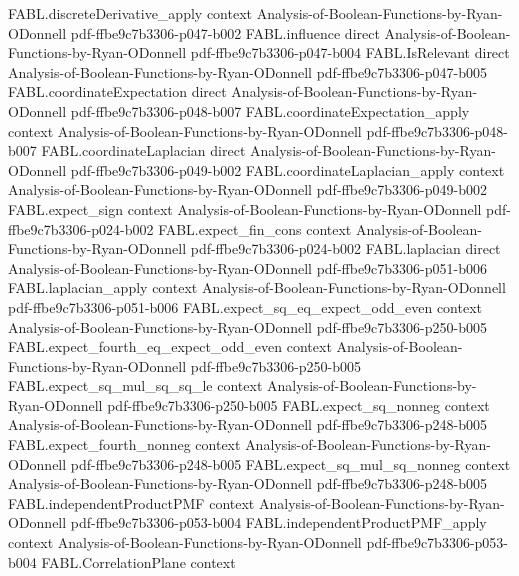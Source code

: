 \begin{theorem}
\proofstep
  {FABL.discreteDerivative_apply}
  {context}
  {Analysis-of-Boolean-Functions-by-Ryan-ODonnell}
  {pdf-ffbe9c7b3306-p047-b002}
\proofstep
  {FABL.influence}
  {direct}
  {Analysis-of-Boolean-Functions-by-Ryan-ODonnell}
  {pdf-ffbe9c7b3306-p047-b004}
\proofstep
  {FABL.IsRelevant}
  {direct}
  {Analysis-of-Boolean-Functions-by-Ryan-ODonnell}
  {pdf-ffbe9c7b3306-p047-b005}
\proofstep
  {FABL.coordinateExpectation}
  {direct}
  {Analysis-of-Boolean-Functions-by-Ryan-ODonnell}
  {pdf-ffbe9c7b3306-p048-b007}
\proofstep
  {FABL.coordinateExpectation_apply}
  {context}
  {Analysis-of-Boolean-Functions-by-Ryan-ODonnell}
  {pdf-ffbe9c7b3306-p048-b007}
\proofstep
  {FABL.coordinateLaplacian}
  {direct}
  {Analysis-of-Boolean-Functions-by-Ryan-ODonnell}
  {pdf-ffbe9c7b3306-p049-b002}
\proofstep
  {FABL.coordinateLaplacian_apply}
  {context}
  {Analysis-of-Boolean-Functions-by-Ryan-ODonnell}
  {pdf-ffbe9c7b3306-p049-b002}
\proofstep
  {FABL.expect_sign}
  {context}
  {Analysis-of-Boolean-Functions-by-Ryan-ODonnell}
  {pdf-ffbe9c7b3306-p024-b002}
\proofstep
  {FABL.expect_fin_cons}
  {context}
  {Analysis-of-Boolean-Functions-by-Ryan-ODonnell}
  {pdf-ffbe9c7b3306-p024-b002}
\proofstep
  {FABL.laplacian}
  {direct}
  {Analysis-of-Boolean-Functions-by-Ryan-ODonnell}
  {pdf-ffbe9c7b3306-p051-b006}
\proofstep
  {FABL.laplacian_apply}
  {context}
  {Analysis-of-Boolean-Functions-by-Ryan-ODonnell}
  {pdf-ffbe9c7b3306-p051-b006}
\proofstep
  {FABL.expect_sq_eq_expect_odd_even}
  {context}
  {Analysis-of-Boolean-Functions-by-Ryan-ODonnell}
  {pdf-ffbe9c7b3306-p250-b005}
\proofstep
  {FABL.expect_fourth_eq_expect_odd_even}
  {context}
  {Analysis-of-Boolean-Functions-by-Ryan-ODonnell}
  {pdf-ffbe9c7b3306-p250-b005}
\proofstep
  {FABL.expect_sq_mul_sq_sq_le}
  {context}
  {Analysis-of-Boolean-Functions-by-Ryan-ODonnell}
  {pdf-ffbe9c7b3306-p250-b005}
\proofstep
  {FABL.expect_sq_nonneg}
  {context}
  {Analysis-of-Boolean-Functions-by-Ryan-ODonnell}
  {pdf-ffbe9c7b3306-p248-b005}
\proofstep
  {FABL.expect_fourth_nonneg}
  {context}
  {Analysis-of-Boolean-Functions-by-Ryan-ODonnell}
  {pdf-ffbe9c7b3306-p248-b005}
\proofstep
  {FABL.expect_sq_mul_sq_nonneg}
  {context}
  {Analysis-of-Boolean-Functions-by-Ryan-ODonnell}
  {pdf-ffbe9c7b3306-p248-b005}
\proofstep
  {FABL.independentProductPMF}
  {context}
  {Analysis-of-Boolean-Functions-by-Ryan-ODonnell}
  {pdf-ffbe9c7b3306-p053-b004}
\proofstep
  {FABL.independentProductPMF_apply}
  {context}
  {Analysis-of-Boolean-Functions-by-Ryan-ODonnell}
  {pdf-ffbe9c7b3306-p053-b004}
\proofstep
  {FABL.CorrelationPlane}
  {context}

\end{theorem}

